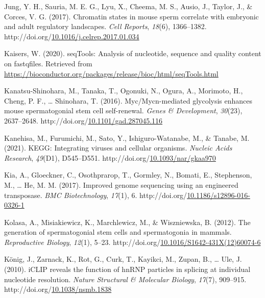 \documentclass[12pt,twoside]{reedthesis}
\newlength{\cslhangindent}
\newenvironment{CSLReferences}[2] %
 {%
  \setlength{\parindent}{0pt}
  \ifodd #1 \everypar{\setlength{\hangindent}{\cslhangindent}}\ignorespaces\fi
  \ifnum #2 > 0
  \setlength{\parskip}{#2\baselineskip}
  \fi
 }%
 {}
\begin{document}
\begin{CSLReferences}{1}{0}
\leavevmode{}%
Jung, Y. H., Sauria, M. E. G., Lyu, X., Cheema, M. S., Ausio, J., Taylor, J., \& Corces, V. G. (2017). Chromatin states in mouse sperm correlate with embryonic and adult regulatory landscapes. \emph{Cell Reports}, \emph{18}(6), 1366--1382. http://doi.org/\href{https://doi.org/10.1016/j.celrep.2017.01.034}{10.1016/j.celrep.2017.01.034}

\leavevmode{}%
Kaisers, W. (2020). seqTools: Analysis of nucleotide, sequence and quality content on fastqfiles. Retrieved from \url{https://bioconductor.org/packages/release/bioc/html/seqTools.html}

\leavevmode{}%
Kanatsu-Shinohara, M., Tanaka, T., Ogonuki, N., Ogura, A., Morimoto, H., Cheng, P. F., \ldots{} Shinohara, T. (2016). Myc/Mycn-mediated glycolysis enhances mouse spermatogonial stem cell self-renewal. \emph{Genes \& Development}, \emph{30}(23), 2637--2648. http://doi.org/\href{https://doi.org/10.1101/gad.287045.116}{10.1101/gad.287045.116}

\leavevmode{}%
Kanehisa, M., Furumichi, M., Sato, Y., Ishiguro-Watanabe, M., \& Tanabe, M. (2021). KEGG: Integrating viruses and cellular organisms. \emph{Nucleic Acids Research}, \emph{49}(D1), D545--D551. http://doi.org/\href{https://doi.org/10.1093/nar/gkaa970}{10.1093/nar/gkaa970}

\leavevmode{}%
Kia, A., Gloeckner, C., Osothprarop, T., Gormley, N., Bomati, E., Stephenson, M., \ldots{} He, M. M. (2017). Improved genome sequencing using an engineered transposase. \emph{BMC Biotechnology}, \emph{17}(1), 6. http://doi.org/\href{https://doi.org/10.1186/s12896-016-0326-1}{10.1186/s12896-016-0326-1}

\leavevmode{}%
Kolasa, A., Misiakiewicz, K., Marchlewicz, M., \& Wiszniewska, B. (2012). The generation of spermatogonial stem cells and spermatogonia in mammals. \emph{Reproductive Biology}, \emph{12}(1), 5--23. http://doi.org/\href{https://doi.org/10.1016/S1642-431X(12)60074-6}{10.1016/S1642-431X(12)60074-6}

\leavevmode{}%
König, J., Zarnack, K., Rot, G., Curk, T., Kayikci, M., Zupan, B., \ldots{} Ule, J. (2010). iCLIP reveals the function of hnRNP particles in splicing at individual nucleotide resolution. \emph{Nature Structural \& Molecular Biology}, \emph{17}(7), 909--915. http://doi.org/\href{https://doi.org/10.1038/nsmb.1838}{10.1038/nsmb.1838}


\end{CSLReferences}
\end{document}
